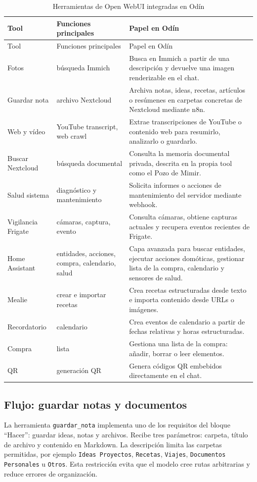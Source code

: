 \begingroup
\scriptsize
\setlength{\tabcolsep}{3pt}
\begin{longtable}{p{}p{}p{}}
  \caption{Herramientas de Open WebUI integradas en Odín}
  \label{tab:openwebui-tools}\\
  \toprule
  Tool & Funciones principales & Papel en Odín \\
  \midrule
  \endfirsthead
  \toprule
  Tool & Funciones principales & Papel en Odín \\
  \midrule
  \endhead
  \bottomrule
  \endfoot
  Fotos & búsqueda Immich & Busca en Immich a partir de una descripción y devuelve una imagen renderizable en el chat. \\
  Guardar nota & archivo Nextcloud & Archiva notas, ideas, recetas, artículos o resúmenes en carpetas concretas de Nextcloud mediante n8n. \\
  Web y vídeo & YouTube transcript, web crawl & Extrae transcripciones de YouTube o contenido web para resumirlo, analizarlo o guardarlo. \\
  Buscar Nextcloud & búsqueda documental & Consulta la memoria documental privada, descrita en la propia tool como el Pozo de Mimir. \\
  Salud sistema & diagnóstico y mantenimiento & Solicita informes o acciones de mantenimiento del servidor mediante webhook. \\
  Vigilancia Frigate & cámaras, captura, evento & Consulta cámaras, obtiene capturas actuales y recupera eventos recientes de Frigate. \\
  Home Assistant & entidades, acciones, compra, calendario, salud & Capa avanzada para buscar entidades, ejecutar acciones domóticas, gestionar lista de la compra, calendario y sensores de salud. \\
  Mealie & crear e importar recetas & Crea recetas estructuradas desde texto e importa contenido desde URLs o imágenes. \\
  Recordatorio & calendario & Crea eventos de calendario a partir de fechas relativas y horas estructuradas. \\
  Compra & lista & Gestiona una lista de la compra: añadir, borrar o leer elementos. \\
  QR & generación QR & Genera códigos QR embebidos directamente en el chat. \\
\end{longtable}
\endgroup

\subsection{Flujo: guardar notas y documentos}
La herramienta \texttt{guardar\_nota} implementa uno de los requisitos del bloque ``Hacer'': guardar ideas, notas y archivos. Recibe tres parámetros: carpeta, título de archivo y contenido en Markdown. La descripción limita las carpetas permitidas, por ejemplo \texttt{Ideas Proyectos}, \texttt{Recetas}, \texttt{Viajes}, \texttt{Documentos Personales} u \texttt{Otros}. Esta restricción evita que el modelo cree rutas arbitrarias y reduce errores de organización.

